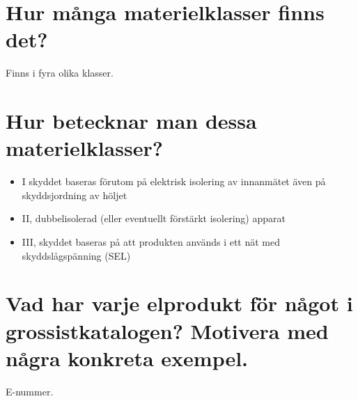 \documentclass[a4paper,swedish]{article}
\begin{document}
\section{Hur många materielklasser finns det?}
\label{sec:q_m_32}

Finns i fyra olika klasser.

\section{Hur betecknar man dessa materielklasser?}

\begin{itemize}
\item I   skyddet baseras förutom på elektrisk isolering av innanmätet även på skyddsjordning av höljet
\item II, dubbelisolerad (eller eventuellt förstärkt isolering) apparat
\item III, skyddet baseras på att produkten används i ett nät med skyddslågspänning (SEL)
\end{itemize}

\section{Vad har varje elprodukt för något i grossistkatalogen? Motivera med några konkreta exempel.}
\label{sec:q_m_34}

E-nummer.
\end{document}
